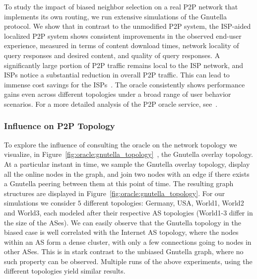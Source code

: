 To study the impact of biased neighbor selection on a real P2P network that
implements its own routing, we run extensive simulations of the Gnutella
protocol. We show that in contrast to the unmodified P2P system, the ISP-aided
localized P2P system shows consistent improvements in the observed end-user
experience, measured in terms of content download times, network locality of
query responses and desired content, and quality of query responses. A
significantly large portion of P2P traffic remains local to the ISP network,
and ISPs notice a substantial reduction in overall P2P traffic. This can lead
to immense cost savings for the ISPs~\cite{Cachelogic}. The oracle consistently
shows performance gains even across different topologies under a broad range of
user behavior scenarios. For a more detailed analysis of the P2P oracle
service, see~\cite{afs-cispp2pcip-ccr07, af-ispabqsp2pt-eccs07,afk-icsecispp2p-icin07}.



\subsubsection{Influence on P2P Topology}\label{sec:Influence-Oracle-on-P2P-Topology}

To explore the influence of consulting the oracle on the network topology we
visualize, in Figure~\ref{fig:oracle:gnutella_topology}~\cite{tashev-thesis},
the Gnutella overlay topology. At a particular instant in time, we sample the
Gnutella overlay topology, display all the online nodes in the graph, and join
two nodes with an edge if there exists a Gnutella peering between them at this
point of time. The resulting graph structures are displayed in
Figure~\ref{fig:oracle:gnutella_topology}. For our simulations we consider $5$
different topologies: Germany, USA, World1, World2 and World3, each modeled
after their respective AS topologies (World1-3 differ in the size of the ASes).
We can easily observe that the Gnutella topology in the biased case is well
correlated with the Internet AS topology, where the nodes within an AS form a
dense cluster, with only a few connections going to nodes in other ASes. This
is in stark contrast to the unbiased Gnutella graph, where no such property can
be observed. Multiple runs of the above experiments, using the different
topologies yield similar results.

